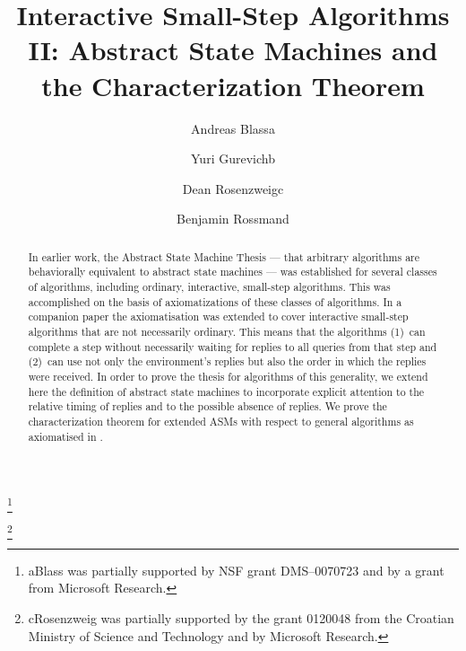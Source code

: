 \documentclass{LMCS}
\theoremstyle{definition}
\begin{document}
\title[Interactive Small-Step Algorithms II]{Interactive Small-Step
  Algorithms II: Abstract State Machines and the Characterization
  Theorem} 
\author[A.~Blass]{Andreas Blass\rsuper a} 
\address{{\lsuper a}Mathematics Dept.,
  University of Michigan, Ann Arbor, MI 48109, U.S.A.}
\thanks{{\lsuper a}Blass was partially supported by NSF
  grant DMS--0070723 and by a grant from Microsoft Research.}

\author[Y.~Gurevich]{Yuri Gurevich\rsuper b}
\address{{\lsuper b}Microsoft Research, One Microsoft Way, Redmond, WA 98052,
U.S.A.}

\author[D.~Rosenzweig]{Dean Rosenzweig\rsuper c} 
\address{{\lsuper c}University of Zagreb, FSB, I. Lu\v ci\'ca 5, 10000 Zagreb,
  Croatia}
\thanks{{\lsuper c}Rosenzweig was partially supported by the grant 0120048 from
  the Croatian Ministry of Science and Technology and by Microsoft
  Research.} 

\author[B.~Rossman]{Benjamin Rossman\rsuper d}
\address{{\lsuper d}Computer Science Dept., M.I.T., Cambridge, MA 02139, U.S.A.}


\begin{abstract}
In earlier work, the Abstract State Machine Thesis --- that
arbitrary algorithms are behaviorally equivalent to abstract state
machines --- was established for several classes of algorithms,
including ordinary, interactive, small-step algorithms.  This was
accomplished on the basis of axiomatizations of these classes of
algorithms. In a companion paper \cite{ga1} the axiomatisation was
extended to cover interactive small-step algorithms that are not
necessarily ordinary. This means that the algorithms (1)~can
complete a step without necessarily waiting for replies to all
queries from that step and (2)~can use not only the environment's
replies but also the order in which the replies were received.  In
order to prove the thesis for algorithms of this generality, we
extend here the definition of abstract state machines to incorporate
explicit attention to the relative timing of replies and to the
possible absence of replies. We prove  the characterization theorem
for extended ASMs with respect to general algorithms as axiomatised
in \cite{ga1}.
\end{abstract}
\end{document}
